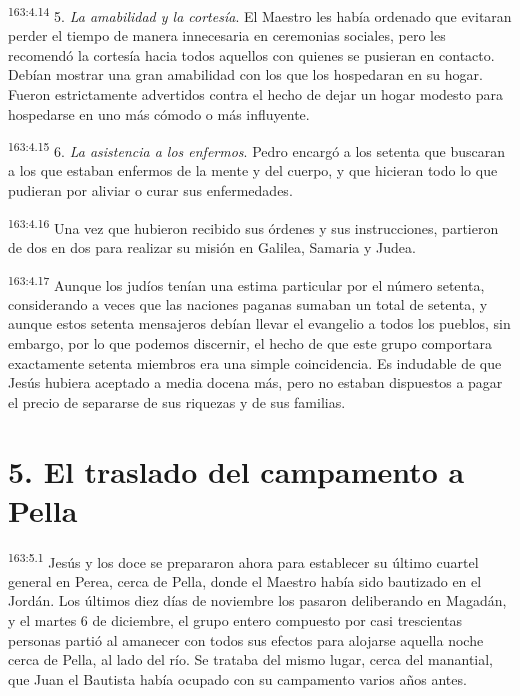 \par 
\textsuperscript{163:4.14} 5. \textit{La amabilidad y la cortesía}. El Maestro les había ordenado que evitaran perder el tiempo de manera innecesaria en ceremonias sociales, pero les recomendó la cortesía hacia todos aquellos con quienes se pusieran en contacto. Debían mostrar una gran amabilidad con los que los hospedaran en su hogar. Fueron estrictamente advertidos contra el hecho de dejar un hogar modesto para hospedarse en uno más cómodo o más influyente.

\par 
\textsuperscript{163:4.15} 6. \textit{La asistencia a los enfermos}. Pedro encargó a los setenta que buscaran a los que estaban enfermos de la mente y del cuerpo, y que hicieran todo lo que pudieran por aliviar o curar sus enfermedades.

\par 
\textsuperscript{163:4.16} Una vez que hubieron recibido sus órdenes y sus instrucciones, partieron de dos en dos para realizar su misión en Galilea, Samaria y Judea.

\par 
\textsuperscript{163:4.17} Aunque los judíos tenían una estima particular por el número setenta, considerando a veces que las naciones paganas sumaban un total de setenta, y aunque estos setenta mensajeros debían llevar el evangelio a todos los pueblos, sin embargo, por lo que podemos discernir, el hecho de que este grupo comportara exactamente setenta miembros era una simple coincidencia. Es indudable de que Jesús hubiera aceptado a media docena más, pero no estaban dispuestos a pagar el precio de separarse de sus riquezas y de sus familias.

\section*{5. El traslado del campamento a Pella}
\par 
\textsuperscript{163:5.1} Jesús y los doce se prepararon ahora para establecer su último cuartel general en Perea, cerca de Pella, donde el Maestro había sido bautizado en el Jordán. Los últimos diez días de noviembre los pasaron deliberando en Magadán, y el martes 6 de diciembre, el grupo entero compuesto por casi trescientas personas partió al amanecer con todos sus efectos para alojarse aquella noche cerca de Pella, al lado del río. Se trataba del mismo lugar, cerca del manantial, que Juan el Bautista había ocupado con su campamento varios años antes.

